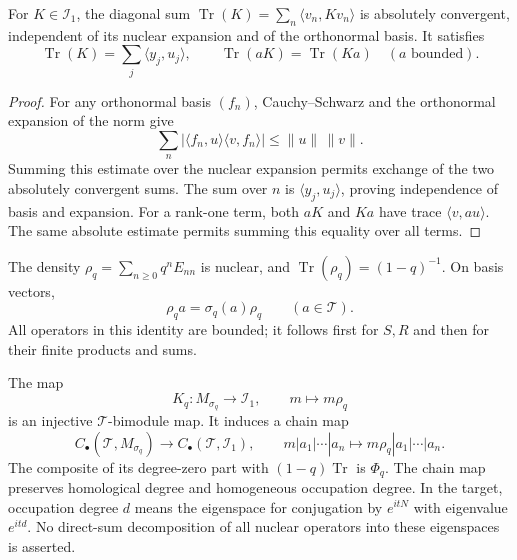 \begin{lemma}
\label{v4-arith:thermal:lem:nuclear-trace}
For $K\in\mathcal I_1$, the diagonal sum
$\operatorname{Tr}(K)=\sum_n\langle v_n,Kv_n\rangle$ is absolutely
convergent, independent of its nuclear expansion and of the
orthonormal basis. It satisfies
\[
 \operatorname{Tr}(K)=\sum_j\langle y_j,u_j\rangle,
 \qquad
 \operatorname{Tr}(aK)=\operatorname{Tr}(Ka)\quad(a\text{ bounded}).
\]
\end{lemma}

\begin{proof}
For any orthonormal basis $(f_n)$, Cauchy--Schwarz and the
orthonormal expansion of the norm give
\[
 \sum_n|\langle f_n,u\rangle\langle v,f_n\rangle|
 \leq\|u\|\,\|v\|.
\]
Summing this estimate over the nuclear expansion permits exchange
of the two absolutely convergent sums. The sum over $n$ is
$\langle y_j,u_j\rangle$, proving independence of basis and
expansion. For a rank-one term, both $aK$ and $Ka$ have trace
$\langle v,au\rangle$. The same absolute estimate permits summing
this equality over all terms.
\end{proof}

The density $\rho_q=\sum_{n\geq0}q^nE_{nn}$ is nuclear, and
$\operatorname{Tr}(\rho_q)=(1-q)^{-1}$. On basis vectors,
\begin{equation}
 \rho_qa=\sigma_q(a)\rho_q\qquad(a\in\mathcal T).
 \label{v4-arith:thermal:eq:density-intertwining}
\end{equation}
All operators in this identity are bounded; it follows first for
$S,R$ and then for their finite products and sums.

\begin{theorem}
\label{v4-arith:thermal:thm:density-chain-map}
The map
\[
 K_q:M_{\sigma_q}\longrightarrow\mathcal I_1,
 \qquad m\longmapsto m\rho_q
\]
is an injective $\mathcal T$-bimodule map. It induces a chain map
\begin{equation}
 C_\bullet(\mathcal T,M_{\sigma_q})
 \longrightarrow C_\bullet(\mathcal T,\mathcal I_1),
 \qquad m|a_1|\cdots|a_n\longmapsto
             m\rho_q|a_1|\cdots|a_n.
 \label{v4-arith:thermal:eq:density-chain-map}
\end{equation}
The composite of its degree-zero part with
$(1-q)\operatorname{Tr}$ is $\Phi_q$. The chain map preserves
homological degree and homogeneous occupation degree. In the target,
occupation degree $d$ means the eigenspace for conjugation by
$e^{itN}$ with eigenvalue $e^{itd}$. No direct-sum decomposition
of all nuclear operators into these eigenspaces is asserted.
\end{theorem}

